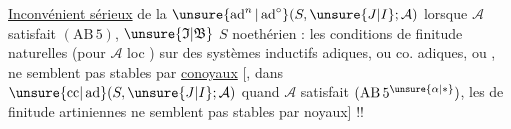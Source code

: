 \uline{Inconvénient sérieux} de la 
$\unsure{\operatorname{ad}^{n}|\operatorname{ad}^{\circ}}(S,\unsure{J|I};\mathcal A)$ lorsque $\mathcal A$ satisfait $(\mathrm{AB}\,5)$, $\unsure{\mathfrak I|\mathfrak B}$ $S$ noethérien : les conditions de finitude naturelles (pour $\mathcal A$ loc ) sur des systèmes inductifs adiques, ou co. adiques, ou , ne semblent pas stables par \uline{conoyaux} [, dans $\unsure{\mathrm{cc}|\operatorname{ad}}(S,\unsure{J|I};\mathcal A)$ quand $\mathcal A$ satisfait $(\mathrm{AB}\,5^{\unsure{\alpha|*}})$, les  de finitude artiniennes ne semblent pas stables par noyaux] !!


